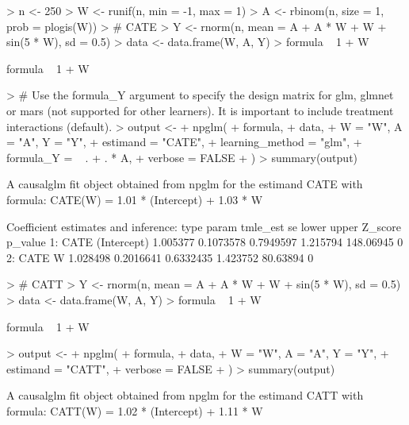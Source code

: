 \documentclass[article]{jss}
\begin{document}
\begin{Schunk}
\begin{Sinput}
> n <- 250
> W <- runif(n, min = -1, max = 1)
> A <- rbinom(n, size = 1, prob = plogis(W))
> # CATE
> Y <- rnorm(n, mean = A + A * W + W + sin(5 * W), sd = 0.5)
> data <- data.frame(W, A, Y)
> formula ~ 1 + W
\end{Sinput}
\begin{Soutput}
formula ~ 1 + W
\end{Soutput}
\begin{Sinput}
> # Use the formula_Y argument to specify the design matrix for glm, glmnet or mars (not supported for other learners). It is important to include treatment interactions (default).
> output <-
+   npglm(
+     formula,
+     data,
+     W = "W", A = "A", Y = "Y",
+     estimand = "CATE",
+     learning_method = "glm",
+     formula_Y = ~ . + . * A,
+     verbose = FALSE
+   )
> summary(output)
\end{Sinput}
\begin{Soutput}
A causalglm fit object obtained from npglm for the estimand CATE with formula: 
CATE(W) = 1.01 * (Intercept) + 1.03 * W

Coefficient estimates and inference:
   type       param tmle_est        se     lower    upper   Z_score p_value
1: CATE (Intercept) 1.005377 0.1073578 0.7949597 1.215794 148.06945       0
2: CATE           W 1.028498 0.2016641 0.6332435 1.423752  80.63894       0
\end{Soutput}
\begin{Sinput}
> # CATT
> Y <- rnorm(n, mean = A + A * W + W + sin(5 * W), sd = 0.5)
> data <- data.frame(W, A, Y)
> formula ~ 1 + W
\end{Sinput}
\begin{Soutput}
formula ~ 1 + W
\end{Soutput}
\begin{Sinput}
> output <-
+   npglm(
+     formula,
+     data,
+     W = "W", A = "A", Y = "Y",
+     estimand = "CATT",
+     verbose = FALSE
+   )
> summary(output)
\end{Sinput}
\begin{Soutput}
A causalglm fit object obtained from npglm for the estimand CATT with formula: 
CATT(W) = 1.02 * (Intercept) + 1.11 * W


\end{Soutput}
\end{Schunk}
\end{document}
